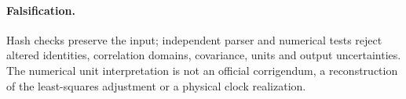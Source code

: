 \paragraph{Falsification.}
Hash checks preserve the input; independent parser and numerical tests reject altered identities, correlation domains, covariance, units and output uncertainties. The numerical unit interpretation is not an official corrigendum, a reconstruction of the least-squares adjustment or a physical clock realization.

